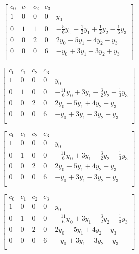 \documentclass{article}
\begin{document}
\begin{center}
$$ \left[\begin{array}{rrrr|r}
c_{0} & c_{1} & c_{2} & c_{3}\\
1 & 0 & 0 & 0 & y_{0}\\
0 & 1 & 1 & 0 & -\frac{5}{6}y_{0}+\frac{1}{2}y_{1}+\frac{1}{2}y_{2}-\frac{1}{6}y_{3}\\
0 & 0 & 2 & 0 & 2y_{0}-5y_{1}+4y_{2}-y_{3}\\
0 & 0 & 0 & 6 & -y_{0}+3y_{1}-3y_{2}+y_{3}\\
\end{array}\right] $$
\end{center}
\begin{center}
$$ \left[\begin{array}{rrrr|r}
c_{0} & c_{1} & c_{2} & c_{3}\\
1 & 0 & 0 & 0 & y_{0}\\
0 & 1 & 0 & 0 & -\frac{11}{6}y_{0}+3y_{1}-\frac{3}{2}y_{2}+\frac{1}{3}y_{3}\\
0 & 0 & 2 & 0 & 2y_{0}-5y_{1}+4y_{2}-y_{3}\\
0 & 0 & 0 & 6 & -y_{0}+3y_{1}-3y_{2}+y_{3}\\
\end{array}\right] $$
\end{center}
\begin{center}
$$ \left[\begin{array}{rrrr|r}
c_{0} & c_{1} & c_{2} & c_{3}\\
1 & 0 & 0 & 0 & y_{0}\\
0 & 1 & 0 & 0 & -\frac{11}{6}y_{0}+3y_{1}-\frac{3}{2}y_{2}+\frac{1}{3}y_{3}\\
0 & 0 & 2 & 0 & 2y_{0}-5y_{1}+4y_{2}-y_{3}\\
0 & 0 & 0 & 6 & -y_{0}+3y_{1}-3y_{2}+y_{3}\\
\end{array}\right] $$
\end{center}
\begin{center}
$$ \left[\begin{array}{rrrr|r}
c_{0} & c_{1} & c_{2} & c_{3}\\
1 & 0 & 0 & 0 & y_{0}\\
0 & 1 & 0 & 0 & -\frac{11}{6}y_{0}+3y_{1}-\frac{3}{2}y_{2}+\frac{1}{3}y_{3}\\
0 & 0 & 2 & 0 & 2y_{0}-5y_{1}+4y_{2}-y_{3}\\
0 & 0 & 0 & 6 & -y_{0}+3y_{1}-3y_{2}+y_{3}\\
\end{array}\right] $$
\end{center}
\end{document}
